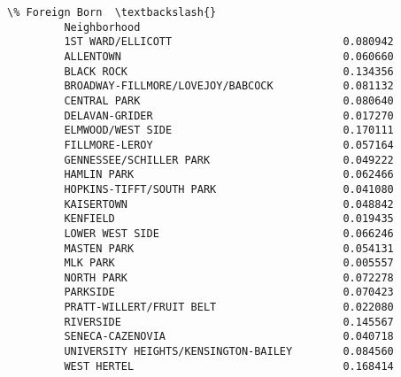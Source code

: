 \documentclass[11pt]{article}
\begin{document}
\begin{Verbatim}[commandchars=\\\{\}]
                                               \% Foreign Born  \textbackslash{}
         Neighborhood                                           
         1ST WARD/ELLICOTT                           0.080942   
         ALLENTOWN                                   0.060660   
         BLACK ROCK                                  0.134356   
         BROADWAY-FILLMORE/LOVEJOY/BABCOCK           0.081132   
         CENTRAL PARK                                0.080640   
         DELAVAN-GRIDER                              0.017270   
         ELMWOOD/WEST SIDE                           0.170111   
         FILLMORE-LEROY                              0.057164   
         GENNESSEE/SCHILLER PARK                     0.049222   
         HAMLIN PARK                                 0.062466   
         HOPKINS-TIFFT/SOUTH PARK                    0.041080   
         KAISERTOWN                                  0.048842   
         KENFIELD                                    0.019435   
         LOWER WEST SIDE                             0.066246   
         MASTEN PARK                                 0.054131   
         MLK PARK                                    0.005557   
         NORTH PARK                                  0.072278   
         PARKSIDE                                    0.070423   
         PRATT-WILLERT/FRUIT BELT                    0.022080   
         RIVERSIDE                                   0.145567   
         SENECA-CAZENOVIA                            0.040718   
         UNIVERSITY HEIGHTS/KENSINGTON-BAILEY        0.084560   
         WEST HERTEL                                 0.168414   
         

\end{Verbatim}
\end{document}
